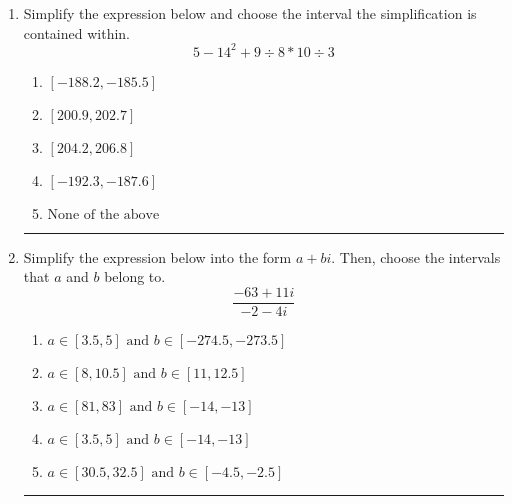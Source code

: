 \documentclass[14pt]{extbook}
\newcommand{\litem}[1]{\item#1\hspace*{-1cm}\rule{\textwidth}{0.4pt}}
\begin{document}
\begin{enumerate}
{\begin{enumerate}[label=\Alph*.]
\end{enumerate} }
\litem{
Simplify the expression below and choose the interval the simplification is contained within.\[ 5 - 14^2 + 9 \div 8 * 10 \div 3 \]\begin{enumerate}[label=\Alph*.]
\item \( [-188.2, -185.5] \)
\item \( [200.9, 202.7] \)
\item \( [204.2, 206.8] \)
\item \( [-192.3, -187.6] \)
\item \( \text{None of the above} \)

\end{enumerate} }
\litem{
Simplify the expression below into the form $a+bi$. Then, choose the intervals that $a$ and $b$ belong to.\[ \frac{-63 + 11 i}{-2 - 4 i} \]\begin{enumerate}[label=\Alph*.]
\item \( a \in [3.5, 5] \text{ and } b \in [-274.5, -273.5] \)
\item \( a \in [8, 10.5] \text{ and } b \in [11, 12.5] \)
\item \( a \in [81, 83] \text{ and } b \in [-14, -13] \)
\item \( a \in [3.5, 5] \text{ and } b \in [-14, -13] \)
\item \( a \in [30.5, 32.5] \text{ and } b \in [-4.5, -2.5] \)

\end{enumerate} }
\end{enumerate}
\end{document}
